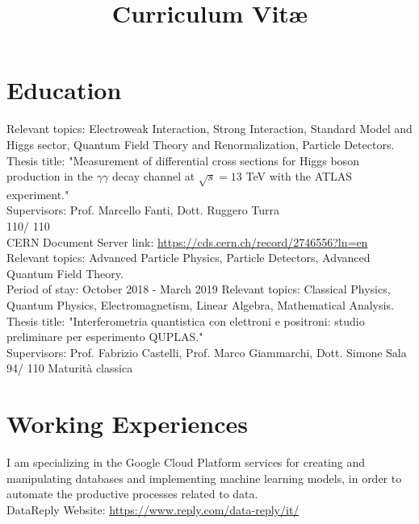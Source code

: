 \documentclass[11pt,a4paper,roman]{moderncv}        %
\title{Curriculum Vit\ae}                               %
\begin{document}
\makecvtitle
\section{Education}
{Relevant topics: Electroweak Interaction, Strong Interaction, Standard Model and Higgs sector, Quantum Field Theory and Renormalization, Particle Detectors. \\
Thesis title: "Measurement of differential cross sections for Higgs boson production in the $\gamma\gamma$ decay channel at $\sqrt{s} = 13$ TeV with the ATLAS experiment." \\
Supervisors: Prof. Marcello Fanti, Dott. Ruggero Turra \\
110/ 110 \\
CERN Document Server link: \url{https://cds.cern.ch/record/2746556?ln=en}}
{Relevant topics: Advanced Particle Physics, Particle Detectors, Advanced Quantum Field Theory. \\
Period of stay:  October 2018 - March 2019}
{Relevant topics: Classical Physics, Quantum Physics, Electromagnetism, Linear Algebra, Mathematical Analysis. \\ 
Thesis title: "Interferometria quantistica con elettroni e positroni: studio preliminare per esperimento QUPLAS." \\
Supervisors: Prof. Fabrizio Castelli, Prof. Marco Giammarchi, Dott. Simone Sala \\
94/ 110}
{Maturità classica}
\section{Working Experiences}
{I am specializing in the Google Cloud Platform services for creating and manipulating databases and implementing machine learning models, in order to automate the productive processes related to data. \\
DataReply Website: \url{https://www.reply.com/data-reply/it/}}
\end{document}
